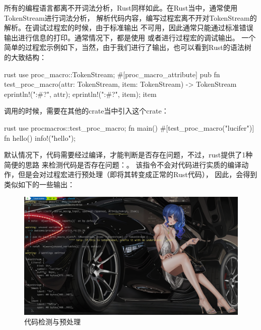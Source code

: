 所有的编程语言都离不开词法分析，Rust同样如此。在Rust当中，通常使用TokenStream进行词法分析，
解析代码内容，编写过程宏离不开对TokenStream的解析。在调试过程宏的时候，由于标准输出
不可用，因此通常只能通过标准错误输出进行信息的打印。通常情况下，都是使用
或者进行过程宏的调试输出。
一个简单的过程宏示例如下，当然，由于我们进行了输出，也可以看到Rust的语法树的大致结构：
\begin{code-block}{rust}
use proc_macro::TokenStream;
#[proc_macro_attribute]
pub fn test_proc_macro(attr: TokenStream, item: TokenStream) -> TokenStream {
    eprintln!("{:#?}", attr);
    eprintln!("{:#?}", item);
    item
}
\end{code-block}
调用的时候，需要在其他的crate当中引入这个crate：
\begin{code-block}{rust}
use procmacros::test_proc_macro;
fn main() { }
#[test_proc_macro("lucifer")]
fn hello() { info!("hello"); }
\end{code-block}

默认情况下，代码需要经过编译，才能判断是否存在问题，不过，rust提供了1种简便的思路
来检测代码是否存在问题：。
该指令不会对代码进行实质的编译动作，但是会对过程宏进行预处理（即将其转变成正常的Rust代码），
因此，会得到类似如下的一些输出：
\begin{figure}[H]
  \centering
  \includegraphics[width=\linewidth]{rust_cargo_check.png}
  \caption{代码检测与预处理}
  \label{fig:rust_cargo_check}
\end{figure}

